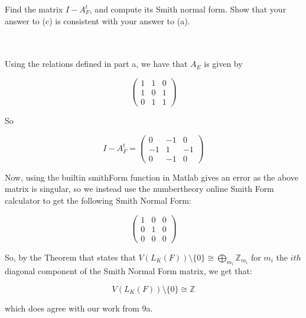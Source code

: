 Find the matrix $I-A_F^t$, and compute its Smith normal form. Show that your answer to (c) is consistent
with your answer to (a).\\\\

\begin{solution}\renewcommand{\qedsymbol}{}\ \\
    Using the relations defined in part a, we have that $A_E$ is given by

    $$\left(\begin{array}{ccc} 1 & 1 & 0 \\ 1 & 0 & 1 \\ 0 & 1 & 1 \end{array}\right)$$

    So

    $$I-A_F^t=\left(\begin{array}{ccc} 0 & -1 & 0 \\ -1 & 1 & -1 \\ 0 & -1 & 0 \end{array}\right)$$

    Now, using the builtin smithForm function in Matlab gives an error as the above matrix is singular,
    so we instead use the numbertheory online Smith Form calculator to get the following Smith Normal
    Form:

    $$\left(\begin{array}{ccc} 1 & 0 & 0 \\ 0 & 1 & 0 \\ 0 & 0 & 0 \end{array}\right)$$

    So, by the Theorem that states that $V(L_K(F))\setminus\{0\}\cong\bigoplus_{m_i}\mathbb{Z}_{m_i}$
    for $m_i$ the $ith$ diagonal component of the Smith Normal Form matrix, we get that:

    $$V(L_K(F))\setminus\{0\}\cong\mathbb{Z}$$

    which does agree with our work from 9a.

\end{solution}